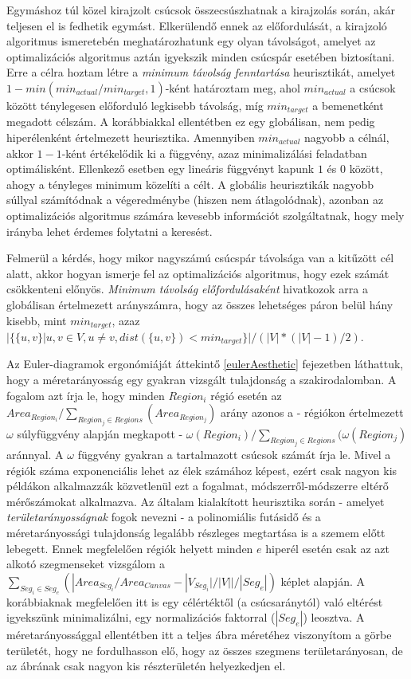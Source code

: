 Egymáshoz túl közel kirajzolt csúcsok összecsúszhatnak a kirajzolás során, akár teljesen el is fedhetik egymást. Elkerülendő ennek az előfordulását, a kirajzoló algoritmus ismeretebén meghatározhatunk egy olyan távolságot, amelyet az optimalizációs algoritmus aztán igyekszik minden csúcspár esetében biztosítani. Erre a célra hoztam létre a \textit{minimum távolság fenntartása} heurisztikát, amelyet $1-min(min_{actual} / min_{target}, 1)$-ként határoztam meg, ahol $min_{actual}$ a csúcsok között ténylegesen előforduló legkisebb távolság, míg $min_{target}$ a bemenetként megadott célszám. A korábbiakkal ellentétben ez egy globálisan, nem pedig hiperélenként értelmezett heurisztika. Amennyiben $min_{actual}$ nagyobb a célnál, akkor $1-1$-ként értékelődik ki a függvény, azaz minimalizálási feladatban optimálisként. Ellenkező esetben egy lineáris függvényt kapunk $1$ és $0$ között, ahogy a tényleges minimum közelíti a célt. A globális heurisztikák nagyobb súllyal számítódnak a végeredménybe (hiszen nem átlagolódnak), azonban az optimalizációs algoritmus számára kevesebb információt szolgáltatnak, hogy mely irányba lehet érdemes folytatni a keresést.


Felmerül a kérdés, hogy mikor nagyszámú csúcspár távolsága van a kitűzött cél alatt, akkor hogyan ismerje fel az optimalizációs algoritmus, hogy ezek számát csökkenteni előnyös. \textit{Minimum távolság előfordulásaként} hivatkozok arra a globálisan értelmezett arányszámra, hogy az összes lehetséges páron belül hány kisebb, mint $min_{target}$, azaz $|\{\{u,v\} | u,v \in V, u \neq v, dist(\{u,v\}) < min_{target}\}| / (|V|*(|V|-1)/2)$.


Az Euler-diagramok ergonómiáját áttekintő \ref{eulerAesthetic} fejezetben láthattuk, hogy a méretarányosság egy gyakran vizsgált tulajdonság a szakirodalomban. A fogalom azt írja le, hogy minden $Region_i$ régió esetén az $Area_{Region_i} / \sum_{Region_j \in Regions}(Area_{Region_j})$ arány azonos a - régiókon értelmezett $\omega$ súlyfüggvény alapján megkapott - $\omega(Region_i) / \sum_{Region_j \in Regions}(\omega(Region_j)$ aránnyal. A $\omega$ függvény gyakran a tartalmazott csúcsok számát írja le. Mivel a régiók száma exponenciális lehet az élek számához képest, ezért csak nagyon kis példákon alkalmazzák közvetlenül ezt a fogalmat, módszerről-módszerre eltérő mérőszámokat alkalmazva. Az általam kialakított heurisztika során - amelyet \textit{területarányosságnak} fogok nevezni - a polinomiális futásidő és a méretarányossági tulajdonság legalább részleges megtartása is a szemem előtt lebegett. Ennek megfelelően régiók helyett minden $e$ hiperél esetén csak az azt alkotó szegmenseket vizsgálom a $\sum_{Seg_i \in Seg_e} (|Area_{Seg_i} / Area_{Canvas} - |V_{Seg_i}| / |V|| / |Seg_e|)$ képlet alapján. A korábbiaknak megfelelően itt is egy célértéktől (a csúcsaránytól) való eltérést igyekszünk minimalizálni, egy normalizációs faktorral ($|Seg_e|$) leosztva. A méretarányossággal ellentétben itt a teljes ábra méretéhez viszonyítom a görbe területét, hogy ne fordulhasson elő, hogy az összes szegmens területarányosan, de az ábrának csak nagyon kis részterületén helyezkedjen el.


